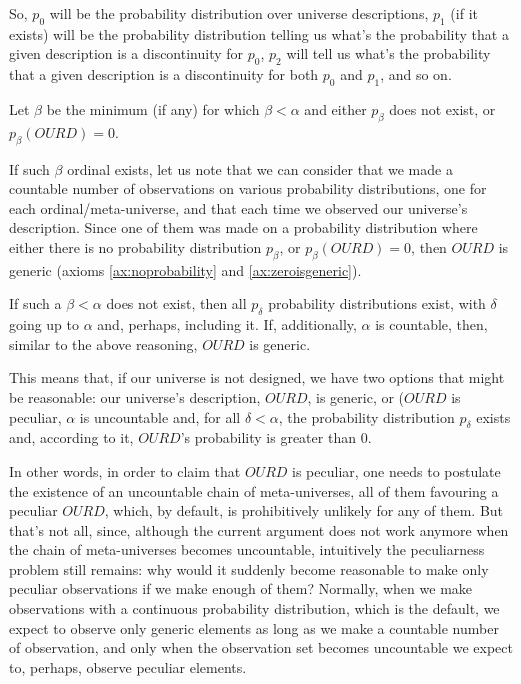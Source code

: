 \documentclass[a4paper
,draft
]{article}
\def\our_description{OURD}
\begin{document}
So, $p_0$ will be the probability distribution over universe descriptions,
$p_1$ (if it exists) will be the probability distribution telling us
what's the probability that a given description is a discontinuity for $p_0$,
$p_2$ will tell us
what's the probability that a given description is a discontinuity for both
$p_0$ and $p_1$, and so on.

Let $\beta$ be the minimum (if any) for which $\beta < \alpha$ and
either $p_\beta$ does not exist, or $p_\beta(\our_description) = 0$.

If such $\beta$ ordinal exists, let us note that we can consider that
we made a countable number of observations on various
probability distributions, one for each ordinal/meta-universe, and that
each time we observed our universe's description.
Since one of them was made on a probability distribution
where either there is no probability distribution $p_\beta$,
or $p_\beta(\our_description)=0$, then $\our_description$ is
generic (axioms \ref{ax:noprobability} and \ref{ax:zeroisgeneric}).

If such a $\beta<\alpha$ does not exist, then all $p_\delta$
probability distributions exist, with $\delta$ going up to $\alpha$ and,
perhaps, including it. If, additionally, $\alpha$ is countable, then,
similar to the above reasoning, $\our_description$ is generic.

This means that, if our universe is not designed, we have two options
that might be reasonable: our universe's description, $\our_description$, is
generic, or ($\our_description$ is peculiar, $\alpha$ is uncountable and,
for all $\delta < \alpha$,
the probability distribution $p_\delta$ exists and, according to it,
$\our_description$'s probability is greater than $0$.

In other words, in order to claim that $\our_description$ is peculiar,
one needs to postulate the
existence of an uncountable chain of meta-universes, all of them favouring a
peculiar $\our_description$, which, by default,
is prohibitively unlikely for any of them.
But that's not all, since, although the
current argument does not work anymore when the chain of
meta-universes becomes uncountable, intuitively the peculiarness problem
still remains: why would it suddenly become reasonable to make
only peculiar observations if we make enough of them? Normally, when we make
observations with a continuous probability distribution, which is the default,
we expect to observe only generic elements as long as we make a
countable number of observation, and only when the observation set
becomes uncountable we expect to, perhaps, observe peculiar elements.
\end{document}
